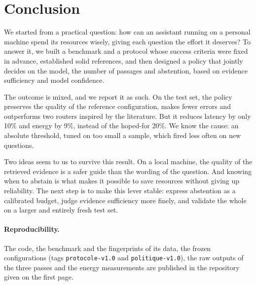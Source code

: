 \documentclass[11pt,a4paper]{article}
\begin{document}
\section{Conclusion}\label{sec:conclusion}

We started from a practical question: how can an assistant running on a personal machine spend its
resources wisely, giving each question the effort it deserves? To answer it, we built a benchmark and a
protocol whose success criteria were fixed in advance, established solid references, and then designed
a policy that jointly decides on the model, the number of passages and abstention, based on evidence
sufficiency and model confidence.

The outcome is mixed, and we report it as such. On the test set, the policy preserves the quality of the
reference configuration, makes fewer errors and outperforms two routers inspired by the literature. But
it reduces latency by only 10\% and energy by 9\%, instead of the hoped-for 20\%. We know the cause: an
absolute threshold, tuned on too small a sample, which fired less often on new questions.

Two ideas seem to us to survive this result. On a local machine, the quality of the retrieved evidence
is a safer guide than the wording of the question. And knowing when to abstain is what makes it possible
to save resources without giving up reliability. The next step is to make this lever stable: express
abstention as a calibrated budget, judge evidence sufficiency more finely, and validate the whole on a
larger and entirely fresh test set.

\paragraph{Reproducibility.} The code, the benchmark and the fingerprints of its data, the frozen
configurations (tags \texttt{protocole-v1.0} and \texttt{politique-v1.0}), the raw outputs of the three
passes and the energy measurements are published in the repository given on the first page.



\end{document}
